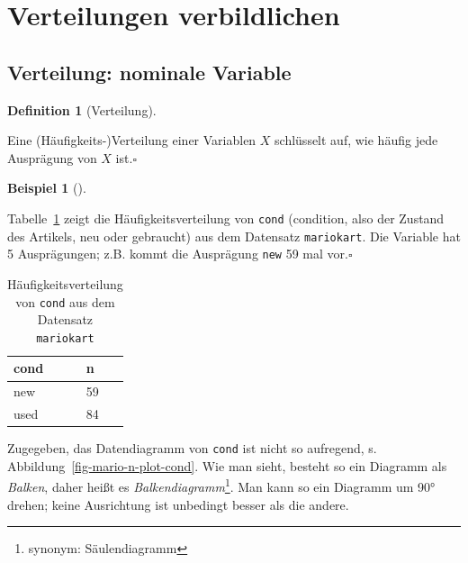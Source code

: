 \documentclass[
  a4paper,
  DIV=11]{scrreprt}
\theoremstyle{definition}
\theoremstyle{definition}
\newtheorem{example}{Beispiel}[chapter]
\theoremstyle{definition}
\newtheorem{definition}{Definition}[chapter]
\theoremstyle{remark}
\begin{document}
\section{Verteilungen verbildlichen}\label{verteilungen-verbildlichen}

\subsection{Verteilung: nominale
Variable}\label{verteilung-nominale-variable}

\begin{definition}[Verteilung]\protect\hypertarget{def-verteilung}{}\label{def-verteilung}

Eine (Häufigkeits-)Verteilung einer Variablen \(X\) schlüsselt auf, wie
häufig jede Ausprägung von \(X\) ist.\(\square\)

\end{definition}

\begin{example}[]\protect\hypertarget{exm-verteilung1}{}\label{exm-verteilung1}

Tabelle~\ref{tbl-wheels-n} zeigt die Häufigkeitsverteilung von
\texttt{cond} (condition, also der Zustand des Artikels, neu oder
gebraucht) aus dem Datensatz \texttt{mariokart}. Die Variable hat 5
Ausprägungen; z.B. kommt die Ausprägung \texttt{new} 59 mal
vor.\(\square\)

\end{example}

\begin{longtable}[]{@{}ll@{}}

\caption{\label{tbl-wheels-n}Häufigkeitsverteilung von \texttt{cond} aus
dem Datensatz \texttt{mariokart}}

\tabularnewline

\toprule\noalign{}
cond & n \\
\midrule\noalign{}
\endhead
\bottomrule\noalign{}
\endlastfoot
new & 59 \\
used & 84 \\

\end{longtable}

Zugegeben, das Datendiagramm von \texttt{cond} ist nicht so aufregend,
s. Abbildung~\ref{fig-mario-n-plot-cond}. Wie man sieht, besteht so ein
Diagramm als \emph{Balken}, daher heißt es
\emph{Balkendiagramm}\footnote{synonym: Säulendiagramm}. Man kann so ein
Diagramm um 90° drehen; keine Ausrichtung ist unbedingt besser als die
andere.
\end{document}
